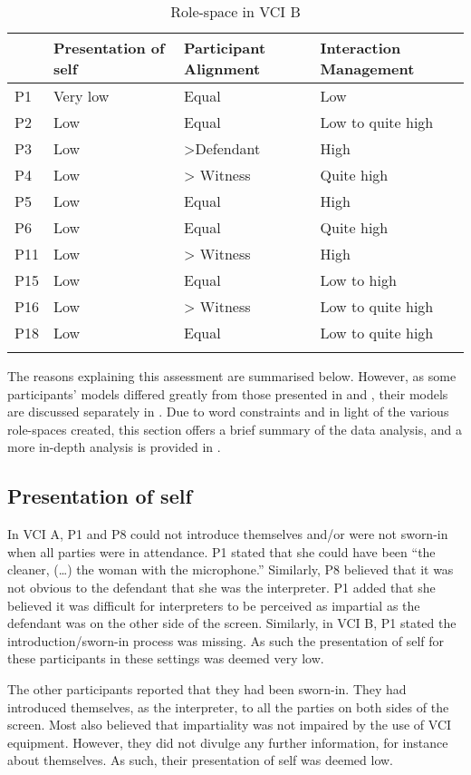 \documentclass[output=paper]{langsci/langscibook}
\begin{document}
\begin{table}
\begin{tabular}{llll}
\lsptoprule
& {Presentation of self} & {Participant Alignment} & {Interaction Management}\\\midrule
P1 & Very low & Equal & Low\\
P2 & Low & Equal & Low to quite high\\
P3 & Low & >Defendant & High\\
P4 & Low & > Witness & Quite high\\
P5 & Low & Equal & High\\
P6 & Low & Equal & Quite high \\
P11 & Low & > Witness & High\\
P15 & Low & Equal & Low to high \\
P16 & Low & > Witness & Low to quite high\\
P18 & Low & Equal & Low to quite high\\
\lspbottomrule
\end{tabular}
\caption{Role-space in \textsc{VCI} B\label{tab:devaux:3}}
\end{table}

The reasons explaining this assessment are summarised below. However, as some participants’ models differed greatly from those presented in  and , their models are discussed separately in . Due to word constraints and in light of the various role-spaces created, this section offers a brief summary of the data analysis, and a more in-depth analysis is provided in \citet{Devaux2017b}.

\subsection{Presentation of self}
In \textsc{VCI} A, P1 and P8 could not introduce themselves and/or were not sworn-in when all parties were in attendance. P1 stated that she could have been “the cleaner, (…) the woman with the microphone.” Similarly, P8 believed that it was not obvious to the defendant that she was the interpreter. P1 added that she believed it was difficult for interpreters to be perceived as impartial as the defendant was on the other side of the screen. Similarly, in \textsc{VCI} B, P1 stated the introduction/sworn-in process was missing. As such the presentation of self for these participants in these settings was deemed very low. 

The other participants reported that they had been sworn-in. They had introduced themselves, as the interpreter, to all the parties on both sides of the screen. Most also believed that impartiality was not impaired by the use of \textsc{VCI} equipment. However, they did not divulge any further information, for instance about themselves. As such, their presentation of self was deemed low.
\end{document}
